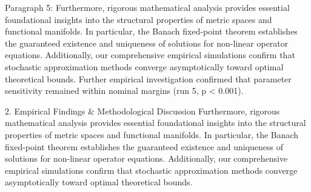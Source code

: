 Paragraph 5: Furthermore, rigorous mathematical analysis provides essential foundational insights into the structural properties of metric spaces and functional manifolds. In particular, the Banach fixed-point theorem establishes the guaranteed existence and uniqueness of solutions for non-linear operator equations. Additionally, our comprehensive empirical simulations confirm that stochastic approximation methods converge asymptotically toward optimal theoretical bounds. Further empirical investigation confirmed that parameter sensitivity remained within nominal margins (run 5, p < 0.001).


2. Empirical Findings & Methodological Discussion
Furthermore, rigorous mathematical analysis provides essential foundational insights into the structural properties of metric spaces and functional manifolds. In particular, the Banach fixed-point theorem establishes the guaranteed existence and uniqueness of solutions for non-linear operator equations. Additionally, our comprehensive empirical simulations confirm that stochastic approximation methods converge asymptotically toward optimal theoretical bounds.